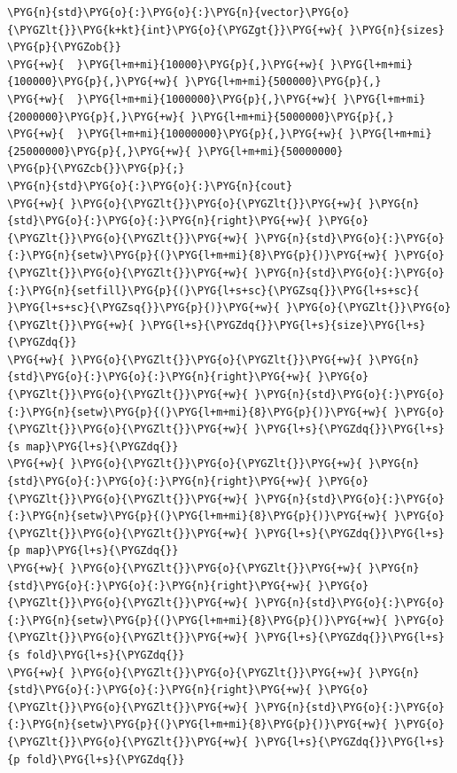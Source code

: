 \begin{codeblockbg}
\begin{Verbatim}[commandchars=\\\{\},breaklines=true,breakanywhere=true,fontsize=\codefont,xleftmargin=17bp]
\PYG{n}{std}\PYG{o}{:}\PYG{o}{:}\PYG{n}{vector}\PYG{o}{\PYGZlt{}}\PYG{k+kt}{int}\PYG{o}{\PYGZgt{}}\PYG{+w}{ }\PYG{n}{sizes}
\PYG{p}{\PYGZob{}}
\PYG{+w}{  }\PYG{l+m+mi}{10000}\PYG{p}{,}\PYG{+w}{ }\PYG{l+m+mi}{100000}\PYG{p}{,}\PYG{+w}{ }\PYG{l+m+mi}{500000}\PYG{p}{,}
\PYG{+w}{  }\PYG{l+m+mi}{1000000}\PYG{p}{,}\PYG{+w}{ }\PYG{l+m+mi}{2000000}\PYG{p}{,}\PYG{+w}{ }\PYG{l+m+mi}{5000000}\PYG{p}{,}
\PYG{+w}{  }\PYG{l+m+mi}{10000000}\PYG{p}{,}\PYG{+w}{ }\PYG{l+m+mi}{25000000}\PYG{p}{,}\PYG{+w}{ }\PYG{l+m+mi}{50000000}
\PYG{p}{\PYGZcb{}}\PYG{p}{;}
\PYG{n}{std}\PYG{o}{:}\PYG{o}{:}\PYG{n}{cout}
\PYG{+w}{ }\PYG{o}{\PYGZlt{}}\PYG{o}{\PYGZlt{}}\PYG{+w}{ }\PYG{n}{std}\PYG{o}{:}\PYG{o}{:}\PYG{n}{right}\PYG{+w}{ }\PYG{o}{\PYGZlt{}}\PYG{o}{\PYGZlt{}}\PYG{+w}{ }\PYG{n}{std}\PYG{o}{:}\PYG{o}{:}\PYG{n}{setw}\PYG{p}{(}\PYG{l+m+mi}{8}\PYG{p}{)}\PYG{+w}{ }\PYG{o}{\PYGZlt{}}\PYG{o}{\PYGZlt{}}\PYG{+w}{ }\PYG{n}{std}\PYG{o}{:}\PYG{o}{:}\PYG{n}{setfill}\PYG{p}{(}\PYG{l+s+sc}{\PYGZsq{}}\PYG{l+s+sc}{ }\PYG{l+s+sc}{\PYGZsq{}}\PYG{p}{)}\PYG{+w}{ }\PYG{o}{\PYGZlt{}}\PYG{o}{\PYGZlt{}}\PYG{+w}{ }\PYG{l+s}{\PYGZdq{}}\PYG{l+s}{size}\PYG{l+s}{\PYGZdq{}}
\PYG{+w}{ }\PYG{o}{\PYGZlt{}}\PYG{o}{\PYGZlt{}}\PYG{+w}{ }\PYG{n}{std}\PYG{o}{:}\PYG{o}{:}\PYG{n}{right}\PYG{+w}{ }\PYG{o}{\PYGZlt{}}\PYG{o}{\PYGZlt{}}\PYG{+w}{ }\PYG{n}{std}\PYG{o}{:}\PYG{o}{:}\PYG{n}{setw}\PYG{p}{(}\PYG{l+m+mi}{8}\PYG{p}{)}\PYG{+w}{ }\PYG{o}{\PYGZlt{}}\PYG{o}{\PYGZlt{}}\PYG{+w}{ }\PYG{l+s}{\PYGZdq{}}\PYG{l+s}{s map}\PYG{l+s}{\PYGZdq{}}
\PYG{+w}{ }\PYG{o}{\PYGZlt{}}\PYG{o}{\PYGZlt{}}\PYG{+w}{ }\PYG{n}{std}\PYG{o}{:}\PYG{o}{:}\PYG{n}{right}\PYG{+w}{ }\PYG{o}{\PYGZlt{}}\PYG{o}{\PYGZlt{}}\PYG{+w}{ }\PYG{n}{std}\PYG{o}{:}\PYG{o}{:}\PYG{n}{setw}\PYG{p}{(}\PYG{l+m+mi}{8}\PYG{p}{)}\PYG{+w}{ }\PYG{o}{\PYGZlt{}}\PYG{o}{\PYGZlt{}}\PYG{+w}{ }\PYG{l+s}{\PYGZdq{}}\PYG{l+s}{p map}\PYG{l+s}{\PYGZdq{}}
\PYG{+w}{ }\PYG{o}{\PYGZlt{}}\PYG{o}{\PYGZlt{}}\PYG{+w}{ }\PYG{n}{std}\PYG{o}{:}\PYG{o}{:}\PYG{n}{right}\PYG{+w}{ }\PYG{o}{\PYGZlt{}}\PYG{o}{\PYGZlt{}}\PYG{+w}{ }\PYG{n}{std}\PYG{o}{:}\PYG{o}{:}\PYG{n}{setw}\PYG{p}{(}\PYG{l+m+mi}{8}\PYG{p}{)}\PYG{+w}{ }\PYG{o}{\PYGZlt{}}\PYG{o}{\PYGZlt{}}\PYG{+w}{ }\PYG{l+s}{\PYGZdq{}}\PYG{l+s}{s fold}\PYG{l+s}{\PYGZdq{}}
\PYG{+w}{ }\PYG{o}{\PYGZlt{}}\PYG{o}{\PYGZlt{}}\PYG{+w}{ }\PYG{n}{std}\PYG{o}{:}\PYG{o}{:}\PYG{n}{right}\PYG{+w}{ }\PYG{o}{\PYGZlt{}}\PYG{o}{\PYGZlt{}}\PYG{+w}{ }\PYG{n}{std}\PYG{o}{:}\PYG{o}{:}\PYG{n}{setw}\PYG{p}{(}\PYG{l+m+mi}{8}\PYG{p}{)}\PYG{+w}{ }\PYG{o}{\PYGZlt{}}\PYG{o}{\PYGZlt{}}\PYG{+w}{ }\PYG{l+s}{\PYGZdq{}}\PYG{l+s}{p fold}\PYG{l+s}{\PYGZdq{}}

\end{Verbatim}
\end{codeblockbg}
